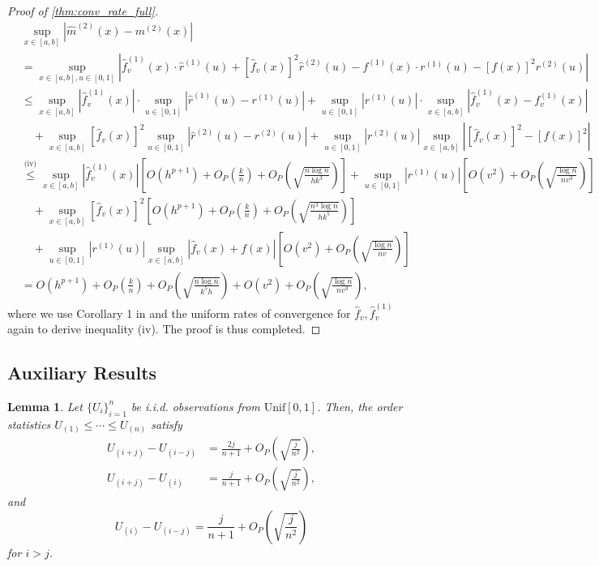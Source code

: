 \documentclass{uwstat572}
\newtheorem{lemma}[theorem]{Lemma}
\theoremstyle{definition}
\renewcommand{\hat}{\widehat}
\theoremstyle{theorem}
\begin{document}
\begin{proof}[Proof of \autoref{thm:conv_rate_full}]
\begin{align*}
&\sup_{x\in [a,b]}\left|\hat{m}^{(2)}(x) -m^{(2)}(x) \right| \\
&= \sup_{x\in [a,b],u\in [0,1]}\left|\hat{f}_v^{(1)}(x) \cdot\hat{r}^{(1)}(u) + \left[\hat{f}_v(x)\right]^2 \hat{r}^{(2)}(u) - f^{(1)}(x) \cdot r^{(1)}(u) -\left[f(x)\right]^2 r^{(2)}(u) \right| \\
&\leq \sup_{x\in [a,b]}\left|\hat{f}_v^{(1)}(x)\right|\cdot \sup_{u\in [0,1]}\left|\hat{r}^{(1)}(u) -r^{(1)}(u) \right| + \sup_{u\in [0,1]}\left|r^{(1)}(u)\right|\cdot \sup_{x\in [a,b]}\left|\hat{f}_v^{(1)}(x) - f_v^{(1)}(x)\right| \\
&\quad + \sup_{x\in [a,b]}\left[\hat{f}_v(x)\right]^2 \sup_{u\in [0,1]}\left|\hat{r}^{(2)}(u) - r^{(2)}(u) \right| + \sup_{u\in [0,1]}\left|r^{(2)}(u)\right| \sup_{x\in [a,b]}\left|\left[\hat{f}_v(x)\right]^2 -\left[f(x)\right]^2\right| \\
&\stackrel{\text{(iv)}}{\leq} \sup_{x\in [a,b]} \left|\hat{f}_v^{(1)}(x)\right| \left[O(h^{p+1}) + O_P\left(\frac{k}{n}\right) +O_P\left(\sqrt{\frac{n\log n}{hk^3}}\right)\right] + \sup_{u\in [0,1]}\left|r^{(1)}(u)\right| \left[O(v^2) + O_P\left(\sqrt{\frac{\log n}{nv^3}}\right)\right]\\
&\quad + \sup_{x\in [a,b]}\left[\hat{f}_v(x)\right]^2 \left[O(h^{p+1}) + O_P\left(\frac{k}{n}\right) +O_P\left(\sqrt{\frac{n^3\log n}{hk^5}}\right)\right] \\
&\quad + \sup_{u\in [0,1]}\left|r^{(1)}(u)\right| \sup_{x\in [a,b]}\left|\hat{f}_v(x) + f(x) \right| \left[O(v^2) + O_P\left(\sqrt{\frac{\log n}{nv}}\right)\right]\\
&= O(h^{p+1}) + O_P\left(\frac{k}{n}\right) +O_P\left(\sqrt{\frac{n\log n}{k^5h}}\right) + O(v^2) + O_P\left(\sqrt{\frac{\log n}{nv^3}}\right),
\end{align*}
where we use Corollary 1 in \cite{francisco2003uniform} and the uniform rates of convergence for $\hat{f}_v, \hat{f}_v^{(1)}$ again to derive inequality (iv). The proof is thus completed.
\end{proof}

\subsection{Auxiliary Results}
\label{App:auxi_res}

\begin{lemma}
\label{lem:unif_asym}
Let $\{U_i\}_{i=1}^n$ be i.i.d. observations from $\mathrm{Unif}[0,1]$. Then, the order statistics $U_{(1)} \leq \cdots \leq U_{(n)}$ satisfy
\begin{align*}
U_{(i+j)} - U_{(i-j)} &= \frac{2j}{n+1} +O_P\left(\sqrt{\frac{j}{n^2}} \right),\\
U_{(i+j)} - U_{(i)} &= \frac{j}{n+1} +O_P\left(\sqrt{\frac{j}{n^2}} \right),
\end{align*}
and
$$U_{(i)} - U_{(i-j)} = \frac{j}{n+1} +O_P\left(\sqrt{\frac{j}{n^2}} \right)$$
for $i>j$.
\end{lemma}
\end{document}
